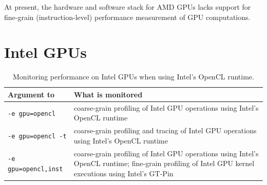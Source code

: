 At present, the hardware and software stack for AMD GPUs lacks support for fine-grain (instruction-level) performance measurement of GPU computations.

\section{Intel GPUs}


{
\centering
 \vspace{2ex}
}


\begin{table}[t]
\centering
\begin{tabular}{|l|p{3.5in}|}\hline
Argument to \hpcrun{} & What is monitored\\\hline\hline
{\tt -e gpu=opencl} & coarse-grain profiling of Intel GPU operations using Intel's OpenCL runtime\\\hline
{\tt -e gpu=opencl -t} & coarse-grain profiling and tracing of Intel GPU operations using Intel's OpenCL runtime\\\hline
{\tt -e gpu=opencl,inst} & coarse-grain profiling of Intel GPU operations using Intel's OpenCL runtime;  fine-grain profiling of Intel GPU kernel executions using Intel's GT-Pin \\\hline
\end{tabular}
\caption{Monitoring performance on Intel GPUs when using Intel's OpenCL runtime.}
\label{intel-opencl-options}
\end{table}


